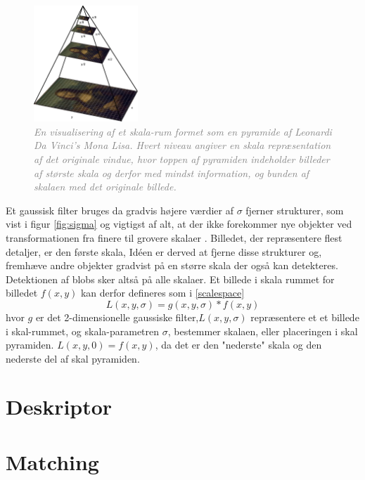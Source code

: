 \begin{figure}[H]
    \centering
    \includegraphics[width=0.35\textwidth]{fig/15.png}
    \vspace{-0.5em}   
    \begin{center}
    \caption{\textcolor{gray}{\footnotesize \textit{
En visualisering af et skala-rum formet som en pyramide af Leonardi Da Vinci's Mona Lisa. Hvert niveau angiver en skala repræsentation af det originale vindue, hvor toppen af pyramiden indeholder billeder af største skala og derfor med mindst information, og bunden af skalaen med det originale billede.
    }}}
    \label{fig:mona}
     \end{center}
  \end{figure}
       \vspace{-2.5em}
\noindent
Et gaussisk filter bruges da gradvis højere værdier af $\sigma$ fjerner strukturer, som vist i figur \ref{fig:sigma} og vigtigst af alt, at der ikke forekommer nye objekter ved transformationen fra finere til grovere skalaer \cite{lindenscale}. Billedet, der repræsentere flest detaljer, er den første skala, Idéen er derved at fjerne disse strukturer og, fremhæve andre objekter gradvist på en større skala der også kan detekteres. Detektionen af blobs sker altså på alle skalaer.
Et billede i skala rummet for billedet $f(x,y)$ kan derfor defineres som i \eqref{scalespace}
\begin{equation}
L(x,y,\sigma) = g(x,y,\sigma)\ast f(x,y)
\label{scalespace}
\end{equation}
hvor $g$ er det 2-dimensionelle gaussiske filter,$L(x,y,\sigma)$ repræsentere et et billede i skal-rummet, og skala-parametren $\sigma$, bestemmer skalaen, eller placeringen i skal pyramiden. $L(x,y,0) = f(x,y)$, da det er den "nederste" skala og den nederste del af skal pyramiden.
\section{Deskriptor}

\section{Matching}
